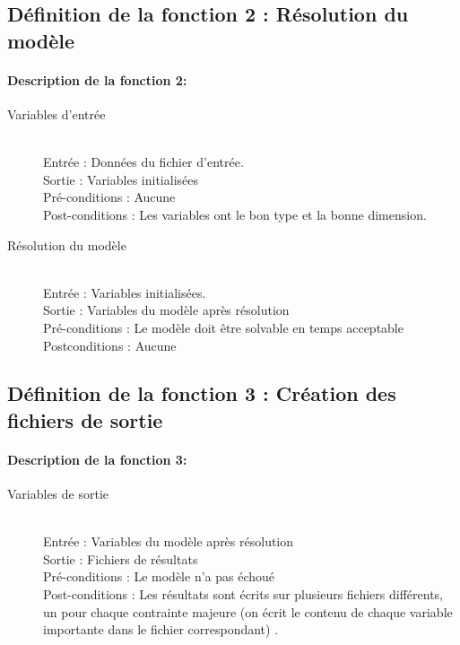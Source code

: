 \documentclass{polytech/polytech}
\numberwithin{figure}{chapter}
\begin{document}
\begin{appendix}
\subsection{Définition de la fonction 2 : Résolution du modèle}

\paragraph{Description de la fonction 2:}

\begin{description}
    \item[Variables d'entrée] ~ \\
        Entrée : Données du fichier d'entrée.\\ 
        Sortie : Variables initialisées\\
        Pré-conditions : Aucune \\
        Post-conditions : Les variables ont le bon type et la bonne dimension.

    \item[Résolution du modèle] ~ \\
        Entrée : Variables initialisées.\\ 
        Sortie : Variables du modèle après résolution\\
        Pré-conditions : Le modèle doit être solvable en temps acceptable\\
        Postconditions : Aucune
\end{description}

\subsection{Définition de la fonction 3 : Création des fichiers de sortie}

\paragraph{Description de la fonction 3:}

\begin{description}
    \item[Variables de sortie] ~ \\
        Entrée : Variables du modèle après résolution\\ 
        Sortie : Fichiers de résultats\\
        Pré-conditions : Le modèle n'a pas échoué \\
        Post-conditions : Les résultats sont écrits sur plusieurs fichiers différents, un pour chaque contrainte majeure (on écrit le contenu de chaque variable importante dans le fichier correspondant) .


\end{description}
\end{appendix}
\end{document}
